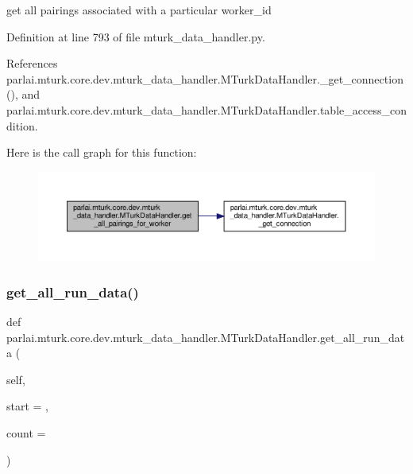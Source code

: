 \begin{DoxyVerb}get all pairings associated with a particular worker_id\end{DoxyVerb}
 

Definition at line 793 of file mturk\+\_\+data\+\_\+handler.\+py.



References parlai.\+mturk.\+core.\+dev.\+mturk\+\_\+data\+\_\+handler.\+M\+Turk\+Data\+Handler.\+\_\+get\+\_\+connection(), and parlai.\+mturk.\+core.\+dev.\+mturk\+\_\+data\+\_\+handler.\+M\+Turk\+Data\+Handler.\+table\+\_\+access\+\_\+condition.

Here is the call graph for this function\+:
\nopagebreak
\begin{figure}[H]
\begin{center}
\leavevmode
\includegraphics[width=350pt]{classparlai_1_1mturk_1_1core_1_1dev_1_1mturk__data__handler_1_1MTurkDataHandler_ab4f6bcf277206b3ac02971f208c2ec32_cgraph}
\end{center}
\end{figure}
\mbox{\label{classparlai_1_1mturk_1_1core_1_1dev_1_1mturk__data__handler_1_1MTurkDataHandler_a23837cfc187beca71c486a2b3000459e}} 
\subsubsection{\texorpdfstring{get\+\_\+all\+\_\+run\+\_\+data()}{get\_all\_run\_data()}}
{\footnotesize\ttfamily def parlai.\+mturk.\+core.\+dev.\+mturk\+\_\+data\+\_\+handler.\+M\+Turk\+Data\+Handler.\+get\+\_\+all\+\_\+run\+\_\+data (\begin{DoxyParamCaption}\item[{}]{self,  }\item[{}]{start = {},  }\item[{}]{count = {} }\end{DoxyParamCaption})}

